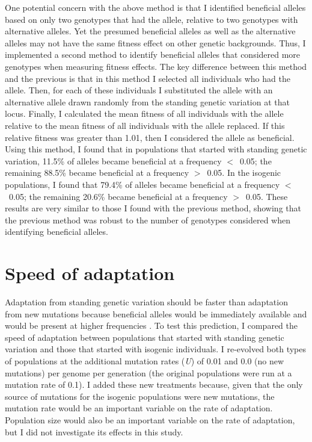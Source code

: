 \begin{doublespace}
One potential concern with the above method
is that I identified beneficial alleles
based on only two genotypes that had the allele,
relative to two genotypes with alternative alleles.
%
Yet the presumed beneficial alleles as well as the alternative alleles
may not have the same fitness effect on other genetic backgrounds.
%
Thus, I implemented a second method to identify beneficial alleles
that considered more genotypes when measuring fitness effects.
%
The key difference between this method and the previous
is that in this method I selected all individuals who had the allele.
%
Then, for each of these individuals
I substituted the allele with an alternative allele
drawn randomly from the standing genetic variation at that locus.
%
Finally, I calculated the mean fitness of all individuals with the allele
relative to the mean fitness of all individuals with the allele replaced.
%
If this relative fitness was greater than 1.01,
then I considered the allele as beneficial.
%
Using this method, I found that
in populations that started with standing genetic variation,
11.5\% of alleles became beneficial at a frequency $<$~0.05;
the remaining 88.5\% became beneficial at a frequency $>$~0.05.
%
In the isogenic populations,
I found that 79.4\% of alleles became beneficial at a frequency $<$~0.05;
the remaining 20.6\% became beneficial at a frequency $>$~0.05.
%
These results are very similar to those I found with the previous method,
showing that the previous method was robust
to the number of genotypes considered when identifying beneficial alleles.



\section{Speed of adaptation}



Adaptation from standing genetic variation
should be faster than adaptation from new mutations
because beneficial alleles would be immediately available
and would be present at higher frequencies \citep{bar08}.
%
To test this prediction,
I compared the speed of adaptation between
populations that started with standing genetic variation
and those that started with isogenic individuals.
%
I re-evolved both types of populations
at the additional mutation rates (\emph{U})
of 0.01 and 0.0 (no new mutations) per genome per generation
(the original populations were run at a mutation rate of 0.1).
%
I added these new treatments because,
given that the only source of mutations
for the isogenic populations were new mutations,
the mutation rate would be an important variable
on the rate of adaptation.
%
Population size would also be an important variable
on the rate of adaptation,
but I did not investigate its effects in this study.




\end{doublespace}
